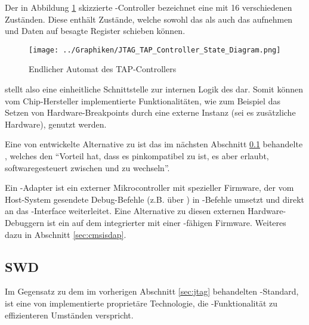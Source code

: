     Der in Abbildung \ref{fig:tapcontroller} skizzierte -Controller bezeichnet eine 
    mit 16 verschiedenen Zuständen.
    Diese  enthält Zustände, welche sowohl das  als auch das 
    aufnehmen und Daten auf besagte Register schieben können.
    \begin{figure}[h]
        \centering
        \caption{Endlicher Automat des TAP-Controllers}
        \label{fig:tapcontroller}
        \texttt{[image: ../Graphiken/JTAG\_TAP\_Controller\_State\_Diagram.png]}
    \end{figure}
     stellt also eine einheitliche Schnittstelle zur internen Logik des  dar. Somit können vom Chip-Hersteller
    implementierte Funktionalitäten, wie zum Beispiel das Setzen von Hardware-Breakpoints durch eine externe Instanz
    (sei es zusätzliche Hardware), genutzt werden.

    Eine von  entwickelte Alternative zu  ist das im nächsten Abschnitt \ref{sec:swd} behandelte
    , welches den ``Vorteil hat, dass es pinkompatibel zu  ist, es aber erlaubt, softwaregesteuert
    zwischen  und  zu wechseln''\citep[]{Asche2017}.

    Ein -Adapter ist ein externer Mikrocontroller mit spezieller Firmware, der vom Host-System gesendete
    Debug-Befehle (z.B. über ) in -Befehle umsetzt und direkt an das -Interface weiterleitet.
    Eine Alternative zu diesen externen Hardware-Debuggern ist ein auf dem  integrierter  mit einer
    -fähigen Firmware. Weiteres dazu in Abschnitt \ref{sec:cmsisdap}.
	\subsection{SWD}
	\label{sec:swd}
	Im Gegensatz zu dem im vorherigen Abschnitt \ref{sec:jtag} behandelten -Standard, ist
	 eine von  implementierte proprietäre Technologie, die -Funktionalität zu
	effizienteren Umständen verspricht.

